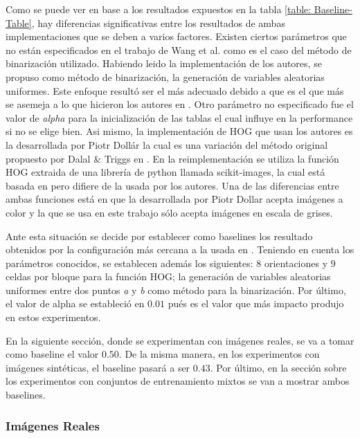 	Como se puede ver en base a los resultados expuestos en la tabla \ref{table: Baseline-Table}, hay diferencias significativas entre los resultados de ambas implementaciones que se deben a varios factores. Existen ciertos parámetros que no están especificados en el trabajo de Wang et al. como es el caso del método de binarización utilizado. Habiendo leido la implementación de los autores, se propuso como método de binarización, la generación de variables aleatorias uniformes. Este enfoque resultó ser el más adecuado debido a que es el que más se asemeja a lo que hicieron los autores en \cite{wang}.	Otro parámetro no especificado fue el valor de \textit{alpha} para la inicialización de las tablas el cual influye en la performance si no se elige bien. Asi mismo, la implementación de HOG que usan los autores es la desarrollada por Piotr Dollár la cual es una variación del método original propuesto por Dalal \& Triggs en \cite{DT05}. En la reimplementación se utiliza la función HOG extraida de una librería de python llamada scikit-images, la cual está basada en \cite{DT05} pero difiere de la usada por los autores. Una de las diferencias entre ambas funciones está en que la desarrollada por Piotr Dollar acepta imágenes a color y la que se usa en este trabajo sólo acepta imágenes en escala de grises.
	
	Ante esta situación se decide por establecer como baselines los resultado obtenidos por la configuración más cercana a la usada en \cite{wang}. Teniendo en cuenta los parámetros conocidos, se establecen además los siguientes: $8$ orientaciones y $9$ celdas por bloque para la función HOG; la generación de variables aleatorias uniformes entre dos puntos \textit{a} y \textit{b} como método para la binarización. Por último, el valor de alpha se estableció en $0.01$ pués es el valor que más impacto produjo en estos experimentos.
	
	En la siguiente sección, donde se experimentan con imágenes reales, se va a tomar como baseline el valor $0.50$. De la misma manera, en los experimentos con imágenes sintéticas, el baseline pasará a ser $0.43$. Por último, en la sección sobre los experimentos con conjuntos de entrenamiento mixtos se van a mostrar ambos baselines.

	\subsubsection{Imágenes Reales}
	

